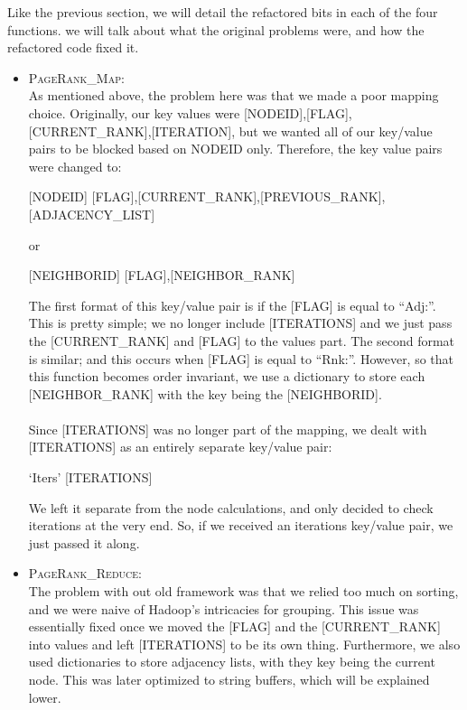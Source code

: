 Like the previous section, we will detail the refactored bits in each of the four functions. we will talk about what the original problems were, and how the refactored code fixed it.
\begin{itemize}
  \item \textsc{PageRank\_Map}: \\
    As mentioned above, the problem here was that we made a poor mapping choice. Originally, our key values were [NODEID],[FLAG],[CURRENT\_RANK],[ITERATION], but we wanted all of our key/value pairs to be blocked based on NODEID only. Therefore, the key value pairs were changed to:
    \begin{center}
      [NODEID] \hspace{8mm} [FLAG],[CURRENT\_RANK],[PREVIOUS\_RANK],[ADJACENCY\_LIST]
    \end{center}
    or
    \begin{center}
      [NEIGHBORID] \hspace{8mm} [FLAG],[NEIGHBOR\_RANK]
    \end{center}
    The first format of this key/value pair is if the [FLAG] is equal to ``Adj:''. This is pretty simple; we no longer include [ITERATIONS] and we just pass the [CURRENT\_RANK] and [FLAG] to the values part. The second format is similar; and this occurs when [FLAG] is equal to ``Rnk:''. However, so that this function becomes order invariant, we use a dictionary to store each [NEIGHBOR\_RANK] with the key being the [NEIGHBORID].
    \\ \\
    Since [ITERATIONS] was no longer part of the mapping, we dealt with [ITERATIONS] as an entirely separate key/value pair: 
    \begin{center}
      `Iters' \hspace{8mm} [ITERATIONS]
    \end{center} 
    We left it separate from the node calculations, and only decided to check iterations at the very end. So, if we received an iterations key/value pair, we just passed it along.
  \item \textsc{PageRank\_Reduce}: \\
    The problem with out old framework was that we relied too much on sorting, and we were naive of Hadoop's intricacies for grouping. This issue was essentially fixed once we moved the [FLAG] and the [CURRENT\_RANK] into values and left [ITERATIONS] to be its own thing. Furthermore, we also used dictionaries to store adjacency lists, with they key being the current node. This was later optimized to string buffers, which will be explained lower.

\end{itemize}
